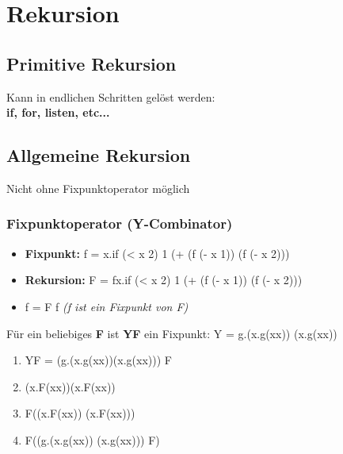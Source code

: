 \section{Rekursion}

\subsection{Primitive Rekursion}
Kann in endlichen Schritten gelöst werden: \\
\textbf{if, for, listen, etc...}

\subsection{Allgemeine Rekursion}
Nicht ohne Fixpunktoperator möglich

\subsubsection{Fixpunktoperator (Y-Combinator)}
\begin{itemize}
    \item \textbf{Fixpunkt:} f = \lambda x.if (< x 2) 1 (+ (f (- x 1)) (f (- x 2)))
    \item \textbf{Rekursion:} F = \lambda fx.if (< x 2) 1 (+ (f (- x 1)) (f (- x 2)))
    \item f = F f \textit{(f ist ein Fixpunkt von F)}
\end{itemize}

Für ein beliebiges \textbf{F} ist \textbf{YF} ein Fixpunkt:
Y = \lambda g.(\lambda x.g(xx)) (\lambda x.g(xx))

\begin{enumerate}
    \item YF = \lambda (g.(\lambda x.g(xx))(\lambda x.g(xx))) F
    \item (\lambda x.F(xx))(\lambda x.F(xx))
    \item F((\lambda x.F(xx)) (\lambda x.F(xx)))
    \item F((\lambda g.(\lambda x.g(xx)) (\lambda x.g(xx))) F)
\end{enumerate}
